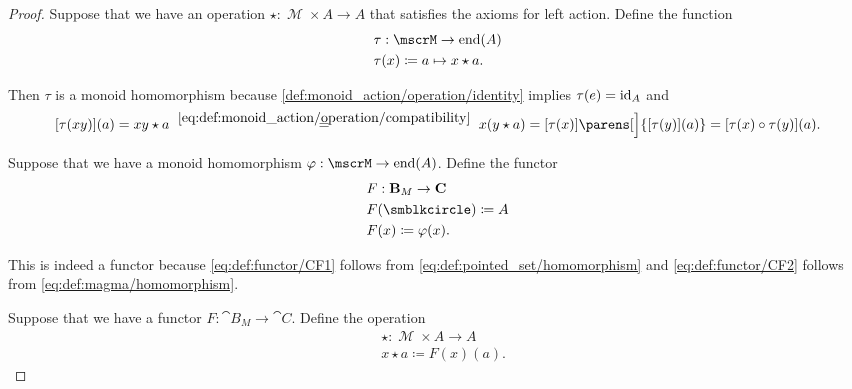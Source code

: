 \begin{proof}
   Suppose that we have an operation \( \star: \mscrM \times A \to A \) that satisfies the axioms for left action. Define the function
  \begin{equation*}
    \begin{aligned}
      &\tau: \mscrM \to \End(A) \\
      &\tau(x) \coloneqq a \mapsto x \star a.
    \end{aligned}
  \end{equation*}

  Then \( \tau \) is a monoid homomorphism because \ref{def:monoid_action/operation/identity} implies \( \tau(e) = \operatorname{id}_A \) and
  \begin{equation}\label{def:monoid_action/homomorphism/proof}
    [\tau(xy)](a)
    =
    xy \star a
    \reloset {\eqref{eq:def:monoid_action/operation/compatibility}} =
    x (y \star a)
    =
    [\tau(x)]\parens[\Big]{ [\tau(y)](a) }
    =
    [\tau(x) \bincirc \tau(y)](a).
  \end{equation}

   Suppose that we have a monoid homomorphism \( \varphi: \mscrM \to \End(A) \). Define the functor
  \begin{equation*}
    \begin{aligned}
      &F: \cat{B}_M \to \cat{C} \\
      &F(\anon) \coloneqq A \\
      &F(x) \coloneqq \varphi(x).
    \end{aligned}
  \end{equation*}

  This is indeed a functor because \eqref{eq:def:functor/CF1} follows from \eqref{eq:def:pointed_set/homomorphism} and \eqref{eq:def:functor/CF2} follows from \eqref{eq:def:magma/homomorphism}.

   Suppose that we have a functor \( F: \cat{B}_M \to \cat{C} \). Define the operation
  \begin{equation*}
    \begin{aligned}
      &\star: \mscrM \times A \to A \\
      &x \star a \coloneqq F(x)(a).
    \end{aligned}
  \end{equation*}


\end{proof}
